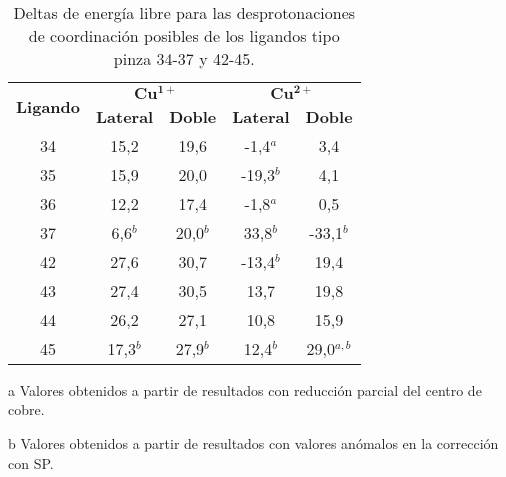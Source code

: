 \begin{table}[t]
\begin{center}
\caption{Deltas de energía libre para las desprotonaciones de coordinación posibles de los ligandos tipo pinza 34-37 y 42-45.}
\begin{threeparttable}
\begin{tabular}{c|cc|cc}
\hline
\multirow{2}{*}{\textbf{Ligando}} & \multicolumn{2}{c|}{\textbf{$\boldsymbol{Cu^{1+}}$}}           & \multicolumn{2}{c}{\textbf{$\boldsymbol{Cu^{2+}}$}}            \\
                                  & \textbf{Lateral} & \textbf{Doble} & \textbf{Lateral} & \textbf{Doble} \\ \hline
34                                & 15,2                  & 19,6                 & -1,4$^{a}$                 & 3,4                  \\
35                                & 15,9                  & 20,0                 & -19,3$^{b}$                & 4,1                  \\
36                                & 12,2                  & 17,4                 & -1,8$^{a}$                 & 0,5                  \\
37                                & 6,6$^{b}$                  & 20,0$^{b}$                & 33,8$^{b}$                 & -33,1$^{b}$               \\
42                                & 27,6                  & 30,7                 & -13,4$^{b}$                & 19,4                 \\
43                                & 27,4                  & 30,5                 & 13,7                  & 19,8                 \\
44                                & 26,2                  & 27,1                 & 10,8                  & 15,9                 \\
45                                & 17,3$^{b}$                 & 27,9$^{b}$                & 12,4$^{b}$                 & 29,0$^{a,b}$               \\ \hline
\end{tabular}
\begin{tablenotes}
    \item[a] \footnotesize{Valores obtenidos a partir de resultados con reducción parcial del centro de cobre}.
    \item[b] \footnotesize{Valores obtenidos a partir de resultados con valores anómalos en la corrección con SP}.
\end{tablenotes}
\end{threeparttable}
\label{deltas_desp_2DE}
\end{center}
\end{table}

